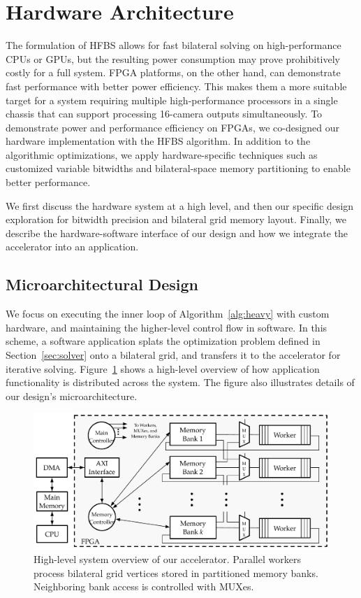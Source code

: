 \section{Hardware Architecture}

The formulation of HFBS allows for fast bilateral solving on high\hyp{}performance CPUs or GPUs, but the resulting power consumption may prove prohibitively costly for a full system.
FPGA platforms, on the other hand, can demonstrate fast performance with better power efficiency.
This makes them a more suitable target for a system requiring multiple high\hyp{}performance processors in a single chassis that can support processing 16-camera outputs simultaneously.
To demonstrate power and performance efficiency on FPGAs, we co-designed our hardware implementation with the HFBS algorithm.
In addition to the algorithmic optimizations, we apply hardware-specific techniques such as customized variable bitwidths and bilateral-space memory partitioning to enable better performance.

We first discuss the hardware system at a high level, and then our specific design exploration for bitwidth precision and bilateral grid memory layout.
Finally, we describe the hardware-software interface of our design and how we integrate the accelerator into an application.


\subsection{Microarchitectural Design}

We focus on executing the inner loop of Algorithm~\ref{alg:heavy} with custom hardware, and maintaining the higher-level control flow in software.
In this scheme, a software application splats the optimization problem defined in Section~\ref{sec:solver} onto a bilateral grid, and transfers it to the accelerator for iterative solving.
Figure~\ref{fig:sys-overview} shows a high-level overview of how application functionality is distributed across the system.
The figure also illustrates details of our design's microarchitecture.

\begin{figure}
\centering
\includegraphics[width=\textwidth]{hfbs-figs/system_architecture.pdf}

\caption{High-level system overview of our accelerator. Parallel workers process bilateral grid vertices stored in partitioned memory banks.
Neighboring bank access is controlled with MUXes.
}
\label{fig:sys-overview}

\end{figure}



